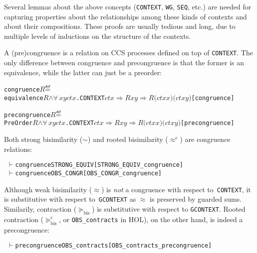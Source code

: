 \documentclass[GCNS]{yincog}
\renewcommand{\HOLinline}[1]{\mbox{\textup{\texttt{#1}}}}
\renewcommand{\HOLConst}[1]{\texttt{#1}}
\renewcommand{\HOLBoundVar}[1]{\ensuremath{\mathit{#1}}}
\renewcommand{\HOLFreeVar}[1]{\ensuremath{\mathit{#1}}}
\renewcommand{\HOLSymConst}[1]{#1}
\renewcommand{\HOLTokenConj}{\ensuremath{\wedge}}
\renewcommand{\HOLTokenDefEquality}{\ensuremath{\mathrel{\overset{\makebox [0pt]{\text{\tiny \textsf{def}}}}{=}}}}
\renewcommand{\HOLTokenForall}{\ensuremath{\forall \,}}
\renewcommand{\HOLTokenTurnstile}{\ensuremath{\:\:\vdash}}
\theoremstyle{remark}
\theoremstyle{theorem}
\theoremstyle{remark}
\renewcommand{\HOLTokenImp}{\ensuremath{\Longrightarrow}}
\newcommand{\mcontrBIS}{\mathrel{\succeq_{\mathrm{bis}}}}
\newcommand{\rcontr}{\mathrel{\succeq^{\mathrm{c}}_{\mathrm{bis}}}}
\begin{document}
Several lemmas about the above concepts (\HOLinline{\HOLConst{CONTEXT}},
\HOLinline{\HOLConst{WG}}, \HOLinline{\HOLConst{SEQ}}, etc.) are needed
for capturing properties about the relationships among these kinds of contexts
and about their compositions. These proofs are usually tedious and long,
due to multiple levels of inductions on the structure of the contexts.

A (pre)congruence is a relation on CCS processes defined on top of
\HOLinline{\HOLConst{CONTEXT}}. The only difference between congruence
and precongruence is that the former is an equivalence, while the latter
can just be a preorder:
%
\begin{alltt}
   \HOLConst{congruence} \HOLFreeVar{R} \HOLTokenDefEquality{}
     \HOLConst{equivalence} \HOLFreeVar{R} \HOLSymConst{\HOLTokenConj{}} \HOLSymConst{\HOLTokenForall{}}\HOLBoundVar{x} \HOLBoundVar{y} \HOLBoundVar{ctx}. \HOLConst{CONTEXT} \HOLBoundVar{ctx} \HOLSymConst{\HOLTokenImp{}} \HOLFreeVar{R} \HOLBoundVar{x} \HOLBoundVar{y} \HOLSymConst{\HOLTokenImp{}} \HOLFreeVar{R} \ensuremath{(}\HOLBoundVar{ctx} \HOLBoundVar{x}\ensuremath{)} \ensuremath{(}\HOLBoundVar{ctx} \HOLBoundVar{y}\ensuremath{)}\hfill{[congruence]}
\end{alltt}

\begin{alltt}
   \HOLConst{precongruence} \HOLFreeVar{R} \HOLTokenDefEquality{}
     \HOLConst{PreOrder} \HOLFreeVar{R} \HOLSymConst{\HOLTokenConj{}} \HOLSymConst{\HOLTokenForall{}}\HOLBoundVar{x} \HOLBoundVar{y} \HOLBoundVar{ctx}. \HOLConst{CONTEXT} \HOLBoundVar{ctx} \HOLSymConst{\HOLTokenImp{}} \HOLFreeVar{R} \HOLBoundVar{x} \HOLBoundVar{y} \HOLSymConst{\HOLTokenImp{}} \HOLFreeVar{R} \ensuremath{(}\HOLBoundVar{ctx} \HOLBoundVar{x}\ensuremath{)} \ensuremath{(}\HOLBoundVar{ctx} \HOLBoundVar{y}\ensuremath{)}\hfill{[precongruence]}
\end{alltt}

Both strong bisimilarity ($\sim $) and rooted bisimilarity ($\approx ^{c}$)
are congruence relations:
%
\begin{alltt}
\HOLTokenTurnstile{} \HOLConst{congruence} \HOLConst{STRONG\_EQUIV}\hfill{[STRONG\_EQUIV\_congruence]}
\HOLTokenTurnstile{} \HOLConst{congruence} \HOLConst{OBS\_CONGR}\hfill{[OBS\_CONGR\_congruence]}
\end{alltt}

Although weak bisimilarity ($\approx $) is \emph{not} a congruence with
respect to~\HOLinline{\HOLConst{CONTEXT}}, it is substitutive with respect
to~\HOLinline{\HOLConst{GCONTEXT}} as $\approx $ is preserved by guarded
sums. Similarily, contraction ($\mcontrBIS $) is substitutive with respect
to \HOLinline{\HOLConst{GCONTEXT}}. Rooted contraction ($\rcontr $, or
\HOLinline{\HOLConst{OBS\_contracts}} in HOL), on the other hand, is indeed
a precongruence:
%
\begin{alltt}
\HOLTokenTurnstile{} \HOLConst{precongruence} \HOLConst{OBS\_contracts}\hfill{[OBS\_contracts\_precongruence]}
\end{alltt}
\end{document}
